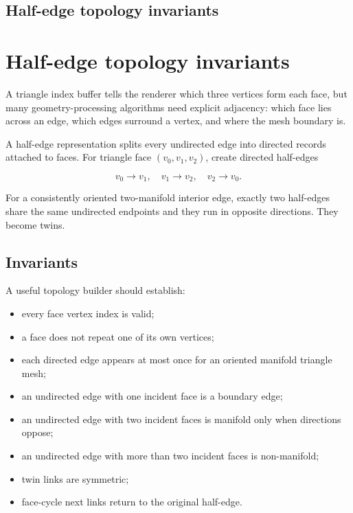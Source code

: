 \hypertarget{appendix-faac749c9cdd}{}
\section*{Half-edge topology invariants}
\chapter{Half-edge topology invariants}\label{appendix-faac749c9cdd-half-edge-topology-invariants}

A triangle index buffer tells the renderer which three vertices form each face, but many geometry-processing algorithms need explicit adjacency: which face lies across an edge, which edges surround a vertex, and where the mesh boundary is.

A half-edge representation splits every undirected edge into directed records attached to faces. For triangle face \((v_0,v_1,v_2)\), create directed half-edges

\[
v_0\rightarrow v_1,\quad
v_1\rightarrow v_2,\quad
v_2\rightarrow v_0.
\]

For a consistently oriented two-manifold interior edge, exactly two half-edges share the same undirected endpoints and they run in opposite directions. They become twins.

\section{Invariants}\label{appendix-faac749c9cdd-invariants}

A useful topology builder should establish:

\begin{itemize}
\tightlist
\item
  every face vertex index is valid;
\item
  a face does not repeat one of its own vertices;
\item
  each directed edge appears at most once for an oriented manifold triangle mesh;
\item
  an undirected edge with one incident face is a boundary edge;
\item
  an undirected edge with two incident faces is manifold only when directions oppose;
\item
  an undirected edge with more than two incident faces is non-manifold;
\item
  twin links are symmetric;
\item
  face-cycle next links return to the original half-edge.
\end{itemize}

